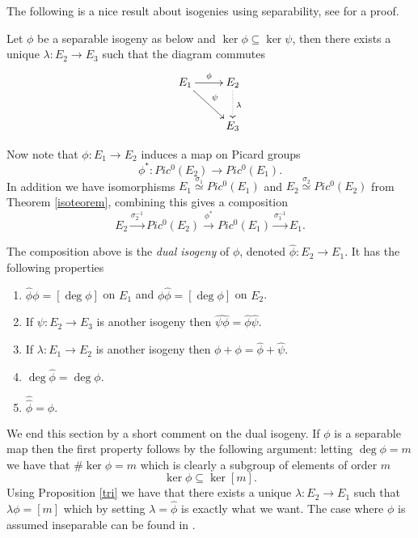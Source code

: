The following is a nice result about isogenies using separability, see \cite{AEC} for a proof.
\begin{prop}\label{tri}
Let $\phi$ be a separable isogeny as below and $\ker \phi \subseteq \ker \psi$,
then there exists a unique $\lambda: E_2 \rightarrow E_3$ such that the diagram
commutes
$$
\xymatrix {
  E_1 \ar[r]^\phi \ar[dr]^\psi & E_2 \ar@{.>}[d]^\lambda \\
  & E_3 \\
}
$$
\end{prop}


Now note that $\phi: E_1 \rightarrow E_2$ induces a map on Picard groups
$$\phi^*: Pic^0(E_2) \rightarrow Pic^0(E_1).$$
In addition we have isomorphisms $E_1 \overset{\sigma_1}{\simeq} Pic^0(E_1)$ and 
$E_2 \overset{\sigma_2}{\simeq} Pic^0(E_2)$ from Theorem \ref{isoteorem}, combining this gives a composition
$$ E_2 \overset{\sigma_2^{-1}}{\rightarrow} Pic^0(E_2) \overset{\phi^*}{\rightarrow} Pic^0(E_1)
\overset{\sigma_1^{-1}}{\rightarrow} E_1. $$

\begin{prop}
 The composition above is the \emph{dual isogeny} of $\phi$, denoted $\widehat{\phi}: E_2 \rightarrow E_1$.
It has the following properties 
\begin{enumerate}
 \item $\widehat{\phi}\phi = [\deg\phi]$ on $E_1$ and $\phi\widehat{\phi} = [\deg\phi]$ on $E_2$.
 \item If $\psi: E_2 \rightarrow E_3$ is another isogeny then $\widehat{\psi \phi} = \widehat{\phi}\widehat{\psi}.$
 \item If $\lambda: E_1 \rightarrow E_2$ is another isogeny then $\widehat{\phi+\phi} = \widehat{\phi}+\widehat{\psi}.$
 \item $\deg\widehat{\phi} = \deg\phi.$
 \item $\widehat{\widehat{\phi}} = \phi.$
\end{enumerate}
\end{prop}

We end this section by a short comment on the dual isogeny. If $\phi$ is a separable map then
the first property follows by the following argument: letting $\deg\phi = m$ we have
that $\#\ker\phi = m$ which is clearly a subgroup of elements of order $m$
$$ \ker \phi \subseteq \ker [m].$$
Using Proposition \ref{tri} we have that there exists a unique $\lambda: E_2 \rightarrow E_1$
such that $\lambda\phi = [m]$ which by setting $\lambda =\widehat{\phi}$ is exactly what we want.
The case where $\phi$ is assumed inseparable can be found in \cite{AEC}.